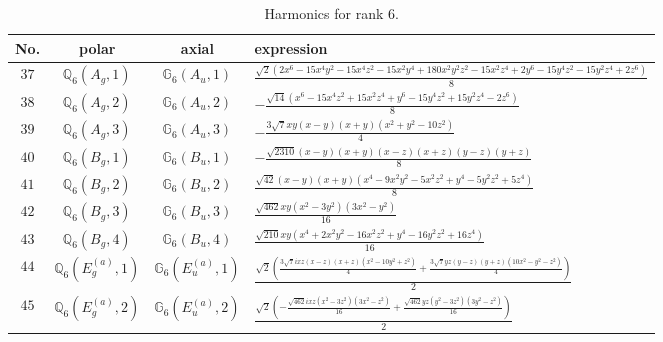 \documentclass[fleqn,8pt,landscape]{jsarticle}
\begin{document}
\begin{table}[ht!]
\begin{center}
\caption{Harmonics for rank 6.}
\renewcommand{\arraystretch}{1.3}
\begin{tabular}{cccl} \hline \hline
No. & polar & axial & expression \\ \hline
$ 37 $ & $ \mathbb{Q}_{6}(A_{g},1) $ & $ \mathbb{G}_{6}(A_{u},1) $ & $ \frac{\sqrt{2} \left(2 x^{6} - 15 x^{4} y^{2} - 15 x^{4} z^{2} - 15 x^{2} y^{4} + 180 x^{2} y^{2} z^{2} - 15 x^{2} z^{4} + 2 y^{6} - 15 y^{4} z^{2} - 15 y^{2} z^{4} + 2 z^{6}\right)}{8} $ \\
$ 38 $ & $ \mathbb{Q}_{6}(A_{g},2) $ & $ \mathbb{G}_{6}(A_{u},2) $ & $ - \frac{\sqrt{14} \left(x^{6} - 15 x^{4} z^{2} + 15 x^{2} z^{4} + y^{6} - 15 y^{4} z^{2} + 15 y^{2} z^{4} - 2 z^{6}\right)}{8} $ \\
$ 39 $ & $ \mathbb{Q}_{6}(A_{g},3) $ & $ \mathbb{G}_{6}(A_{u},3) $ & $ - \frac{3 \sqrt{7} x y \left(x - y\right) \left(x + y\right) \left(x^{2} + y^{2} - 10 z^{2}\right)}{4} $ \\
$ 40 $ & $ \mathbb{Q}_{6}(B_{g},1) $ & $ \mathbb{G}_{6}(B_{u},1) $ & $ - \frac{\sqrt{2310} \left(x - y\right) \left(x + y\right) \left(x - z\right) \left(x + z\right) \left(y - z\right) \left(y + z\right)}{8} $ \\
$ 41 $ & $ \mathbb{Q}_{6}(B_{g},2) $ & $ \mathbb{G}_{6}(B_{u},2) $ & $ \frac{\sqrt{42} \left(x - y\right) \left(x + y\right) \left(x^{4} - 9 x^{2} y^{2} - 5 x^{2} z^{2} + y^{4} - 5 y^{2} z^{2} + 5 z^{4}\right)}{8} $ \\
$ 42 $ & $ \mathbb{Q}_{6}(B_{g},3) $ & $ \mathbb{G}_{6}(B_{u},3) $ & $ \frac{\sqrt{462} x y \left(x^{2} - 3 y^{2}\right) \left(3 x^{2} - y^{2}\right)}{16} $ \\
$ 43 $ & $ \mathbb{Q}_{6}(B_{g},4) $ & $ \mathbb{G}_{6}(B_{u},4) $ & $ \frac{\sqrt{210} x y \left(x^{4} + 2 x^{2} y^{2} - 16 x^{2} z^{2} + y^{4} - 16 y^{2} z^{2} + 16 z^{4}\right)}{16} $ \\
$ 44 $ & $ \mathbb{Q}_{6}(E_{g}^{(a)},1) $ & $ \mathbb{G}_{6}(E_{u}^{(a)},1) $ & $ \frac{\sqrt{2} \left(\frac{3 \sqrt{7} i x z \left(x - z\right) \left(x + z\right) \left(x^{2} - 10 y^{2} + z^{2}\right)}{4} + \frac{3 \sqrt{7} y z \left(y - z\right) \left(y + z\right) \left(10 x^{2} - y^{2} - z^{2}\right)}{4}\right)}{2} $ \\
$ 45 $ & $ \mathbb{Q}_{6}(E_{g}^{(a)},2) $ & $ \mathbb{G}_{6}(E_{u}^{(a)},2) $ & $ \frac{\sqrt{2} \left(- \frac{\sqrt{462} i x z \left(x^{2} - 3 z^{2}\right) \left(3 x^{2} - z^{2}\right)}{16} + \frac{\sqrt{462} y z \left(y^{2} - 3 z^{2}\right) \left(3 y^{2} - z^{2}\right)}{16}\right)}{2} $ \\

\end{tabular}
\end{center}
\end{table}
\end{document}
